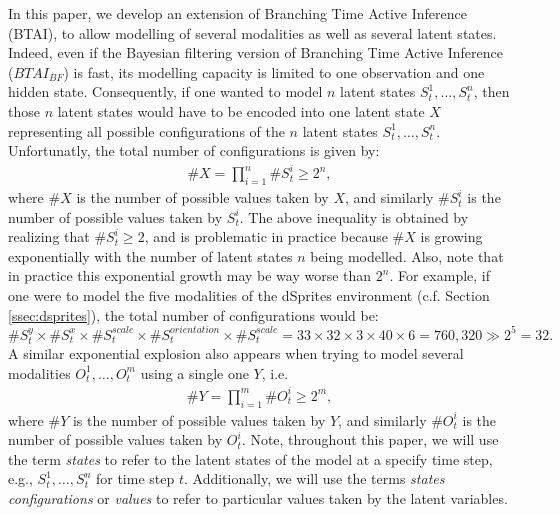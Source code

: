 \documentclass[twoside,11pt]{article}
\newcommand{\nb}[1]{\# #1}
\begin{document}
In this paper, we develop an extension of Branching Time Active Inference (BTAI), to allow modelling of several modalities as well as several latent states. Indeed, even if the Bayesian filtering version of Branching Time Active Inference ($BTAI_{BF}$) is fast, its modelling capacity is limited to one observation and one hidden state. Consequently, if one wanted to model $n$ latent states $S_t^1, \hdots, S_t^n$, then those $n$ latent states would have to be encoded into one latent state $X$ representing all possible configurations of the $n$ latent states $S_t^1, \hdots, S_t^n$. Unfortunatly, the total number of configurations is given by:
\begin{align*}
\nb{X} = \prod_{i=1}^n \nb{S_t^i} \geq 2^n,
\end{align*}
where $\nb{X}$ is the number of possible values taken by $X$, and similarly $\nb{S_t^i}$ is the number of possible values taken by $S_t^i$. The above inequality is obtained by realizing that $\nb{S_t^i} \geq 2$, and is problematic in practice because $\nb{X}$ is growing exponentially with the number of latent states $n$ being modelled. Also, note that in practice this exponential growth may be way worse than $2^n$. For example, 
if one were to model the five modalities of the dSprites environment (c.f. Section \ref{ssec:dsprites}), the total number of configurations would be:
$$\nb{S^y_t} \times \nb{S^{x}_t} \times \nb{S^{scale}_t} \times \nb{S^{orientation}_t} \times \nb{S^{scale}_t} = 33 \times 32 \times 3 \times 40 \times 6 = 760,320 \gg 2^5 = 32.$$
A similar exponential explosion also appears when trying to model several modalities $O_t^1, \hdots, O_t^m$ using a single one $Y$, i.e.
\begin{align*}
\nb{Y} = \prod_{i=1}^m \nb{O_t^i} \geq 2^m,
\end{align*}
where $\nb{Y}$ is the number of possible values taken by $Y$, and similarly $\nb{O_t^i}$ is the number of possible values taken by $O_t^i$. Note, throughout this paper, we will use the term \textit{states} to refer to the latent states of the model at a specify time step, e.g., $S_t^1, \hdots, S_t^n$ for time step $t$. Additionally, we will use the terms \textit{states configurations} or \textit{values} to refer to particular values taken by the latent variables.
\end{document}
